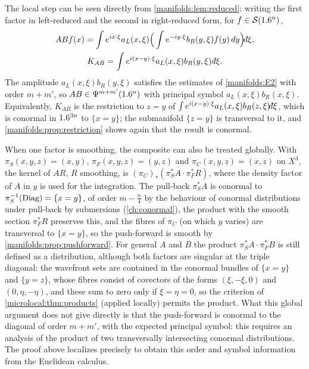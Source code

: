 The local step can be seen directly from \cref{manifolds:lem:reduced}: writing
the first factor in left-reduced and the second in right-reduced form, for
$f\in\mathcal{S}(1.6^n)$,
\begin{equation}\label{manifolds:eq:left-right-composition}
\begin{gathered}
ABf(x)=\int e^{ix\cdot\xi}a_L(x,\xi)\Big(\int e^{-iy\cdot\xi}b_R(y,\xi)f(y)\,dy\Big)\dbar\xi,\\
K_{AB}=\int e^{i(x-y)\cdot\xi}a_L(x,\xi)b_R(y,\xi)\,\dbar\xi .
\end{gathered}
\end{equation}
The amplitude $a_L(x,\xi)b_R(y,\xi)$ satisfies the estimates of
\ref{manifolds:E2} with order $m+m'$, so $AB\in\Psi^{m+m'}(1.6^n)$ with principal
symbol $a_L(x,\xi)b_R(x,\xi)$. Equivalently, $K_{AB}$ is the restriction to $z=y$ of
$\int e^{i(x-y)\cdot\xi}a_L(x,\xi)b_R(z,\xi)\dbar\xi$, which is conormal in
$1.6^{3n}$ to $\{x=y\}$; the submanifold $\{z=y\}$ is transversal to it, and
\cref{manifolds:prop:restriction} shows again that the result is conormal.

\begin{remark}\label{manifolds:rem:global-composition}
When one factor is smoothing, the composite can also be treated globally. With
$\pi_S(x,y,z)=(x,y)$, $\pi_F(x,y,z)=(y,z)$ and $\pi_C(x,y,z)=(x,z)$ on $X^3$,
the kernel of $AR$, $R$ smoothing, is
$(\pi_C)_*(\pi_S^*A\cdot\pi_F^*R)$, where the density factor of $A$ in $y$ is
used for the integration. The pull-back $\pi_S^*A$ is conormal to
$\pi_S^{-1}(\operatorname{Diag})=\{x=y\}$, of order $m-\frac n4$ by the behaviour of conormal
distributions under pull-back by submersions (\cref{ch:conormal}), the product with
the smooth section $\pi_F^*R$ preserves this, and the fibres of $\pi_C$ (on
which $y$ varies) are transversal to $\{x=y\}$, so the push-forward is smooth
by \cref{manifolds:prop:pushforward}. For general $A$ and $B$ the
product $\pi_S^*A\cdot\pi_F^*B$ is still defined as a distribution, although both
factors are singular at the triple diagonal: the wavefront sets are contained in
the conormal bundles of $\{x=y\}$ and $\{y=z\}$, whose fibres consist of covectors
of the forms $(\xi,-\xi,0)$ and $(0,\eta,-\eta)$, and these sum to zero only if
$\xi=\eta=0$, so the criterion of \cref{microlocal:thm:products} (applied locally)
permits the product. What this global argument does not give directly is that the
push-forward is conormal to the diagonal of order $m+m'$, with the expected
principal symbol: this requires an analysis of the product of two transversally
intersecting conormal distributions. The proof above localizes precisely to obtain
this order and symbol information from the Euclidean calculus.
\end{remark}

